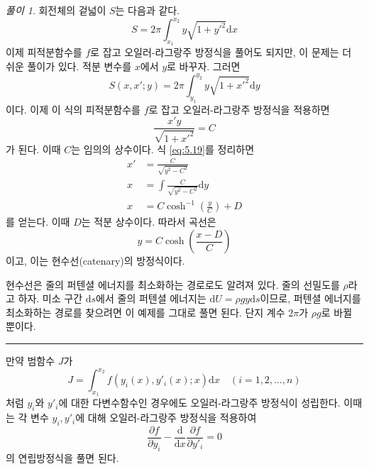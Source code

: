 \documentclass[chapter, oneside, b5paper]{oblivoir}
\theoremstyle{plain}
\theoremstyle{definition}
\theoremstyle{remark}
\newtheorem*{solution}{풀이}
\begin{document}
\begin{solution}
    회전체의 겉넓이 $S$는 다음과 같다.
    \begin{equation}
        S = 2\pi \int_{x_1}^{x_2}y\sqrt{1+{y'}^2} \mathrm{d}x
        \label{eq:5.17}
    \end{equation}
    이제 피적분함수를 $f$로 잡고 오일러-라그랑주 방정식을 풀어도 되지만, 이 문제는 더 쉬운 풀이가 있다. 적분 변수를 $x$에서 $y$로 바꾸자. 그러면
    \begin{equation}
        S(x, x' ; y) = 2\pi \int_{y_1}^{y_2}y\sqrt{1+{x'}^2} \mathrm{d}y
    \end{equation}
    이다. 이제 이 식의 피적분함수를 $f$로 잡고 오일러-라그랑주 방정식을 적용하면
    \begin{equation}
        \frac{x'y}{\sqrt{1 + {x'}^2}} = C
        \label{eq:5.19}
    \end{equation}
    가 된다. 이때 $C$는 임의의 상수이다. 식 \ref{eq:5.19}를 정리하면
    \begin{equation}
    \begin{aligned}
        x' &= \frac{C}{\sqrt{y^2-C^2}} \\
        x &= \int\frac{C}{\sqrt{y^2-C^2}} \mathrm{d}y \\
        x &= C\cosh^{-1}{\left( \frac{y}{C} \right)} + D
    \end{aligned}
    \end{equation}
    를 얻는다. 이때 $D$는 적분 상수이다. 따라서 곡선은
    \begin{equation}
        y = C\cosh{\left( \frac{x-D}{C} \right)}
    \end{equation}
    이고, 이는 현수선(catenary)의 방정식이다.

    현수선은 줄의 퍼텐셜 에너지를 최소화하는 경로로도 알려져 있다. 줄의 선밀도를 $\rho$라고 하자. 미소 구간 $\mathrm{d}s$에서 줄의 퍼텐셜 에너지는 $\mathrm{d}U = \rho g y \mathrm{d}s$이므로, 퍼텐셜 에너지를 최소화하는 경로를 찾으려면 이 예제를 그대로 풀면 된다. 단지 계수 $2\pi$가 $\rho g$로 바뀔 뿐이다.
\end{solution}

\noindent\rule{\textwidth}{0.8pt} %
\vspace{1em} %

만약 범함수 $J$가
\begin{equation}
    J = \int_{x_1}^{x_2} f(y_i (x), y'_i(x) ; x) \mathrm{d}x \quad (i=1, 2, \dots, n)
    \label{eq:5.22}
\end{equation}
처럼 $y_i$와 $y'_i$에 대한 다변수함수인 경우에도 오일러-라그랑주 방정식이 성립한다. 이때는 각 변수 $y_i, y'_i$에 대해 오일러-라그랑주 방정식을 적용하여
\begin{equation}
    \frac{\partial f}{\partial y_i} - \frac{\mathrm{d}}{\mathrm{d}x}\frac{\partial f}{\partial y'_i} = 0
\end{equation}
의 연립방정식을 풀면 된다.
\end{document}
